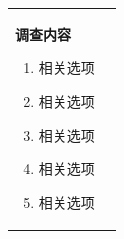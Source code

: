 \documentclass[UTF8,10pt,a4paper,fontset=fandol]{ctexart}
\newcommand{\fieldvalue}[1]{#1}
\newcommand{\handwritten}[1]{#1}
\begin{document}
\noindent
\begin{tabularx}{\textwidth}{|p{}|X|}
\hline
\begin{minipage}[t]{0.46\textwidth}
\textbf{调查内容}

\begin{enumerate}
\item
\fieldvalue{\handwritten{\checkmark}}
\quad 相关选项

\item
\fieldvalue{\handwritten{\checkmark}}
\quad 相关选项

\item
\fieldvalue{\handwritten{\checkmark}}
\quad 相关选项

\item
\fieldvalue{\handwritten{\checkmark}}
\quad 相关选项

\item
\fieldvalue{\handwritten{\checkmark}}
\quad 相关选项
\end{enumerate}

\vspace{1em}

\fieldvalue{\handwritten{\checkmark}}\quad

\fieldvalue{\handwritten{\checkmark}}\quad

\fieldvalue{\handwritten{\checkmark}}\quad

\fieldvalue{\handwritten{\checkmark}}\quad

\fieldvalue{\handwritten{\checkmark}}\quad

\fieldvalue{\handwritten{\checkmark}}\quad


\end{minipage}
\end{tabularx}
\end{document}
